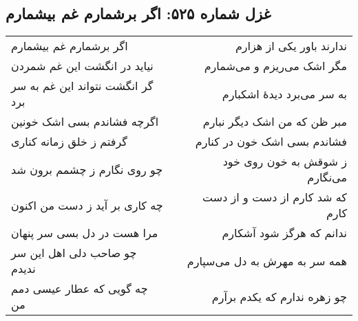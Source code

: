 \begin{center}
\section*{غزل شماره ۵۲۵: اگر برشمارم غم بیشمارم}
\label{sec:525}
\begin{longtable}{l p{0.5cm} r}
اگر برشمارم غم بیشمارم
&&
ندارند باور یکی از هزارم
\\
نیاید در انگشت این غم شمردن
&&
مگر اشک می‌ریزم و می‌شمارم
\\
گر انگشت نتواند این غم به سر برد
&&
به سر می‌برد دیدهٔ اشکبارم
\\
اگرچه فشاندم بسی اشک خونین
&&
مبر ظن که من اشک دیگر نبارم
\\
گرفتم ز خلق زمانه کناری
&&
فشاندم بسی اشک خون در کنارم
\\
چو روی نگارم ز چشمم برون شد
&&
ز شوقش به خون روی خود می‌نگارم
\\
چه کاری بر آید ز دست من اکنون
&&
که شد کارم از دست و از دست کارم
\\
مرا هست در دل بسی سر پنهان
&&
ندانم که هرگز شود آشکارم
\\
چو صاحب دلی اهل این سر ندیدم
&&
همه سر به مهرش به دل می‌سپارم
\\
چه گویی که عطار عیسی دمم من
&&
چو زهره ندارم که یکدم برآرم
\\
\end{longtable}
\end{center}
